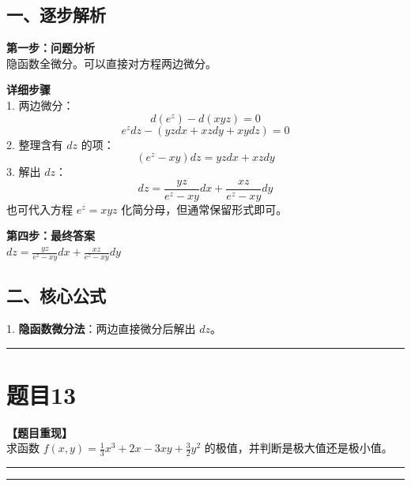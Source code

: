 \documentclass[12pt, a4paper]{ctexart}
\newcommand{\TopSeparator}{
    \par\noindent\rule{\textwidth}{1.5pt}\vspace{0.5em} %
}
\newcommand{\AnalysisSeparator}{
    \par\noindent\rule{\textwidth}{0.5pt}\vspace{0.2em}\hrule\vspace{0.5em} %
}
\newenvironment{RedAnalysis}{
    \par
    \color{red} %
}{
    \par
    \color{black} %
}
\begin{document}
\begin{RedAnalysis}

\subsection*{一、逐步解析}

\textbf{第一步：问题分析} \\
隐函数全微分。可以直接对方程两边微分。

\textbf{详细步骤} \\
1. 两边微分：
   \[ d(e^z) - d(xyz) = 0 \]
   \[ e^z dz - (yz dx + xz dy + xy dz) = 0 \]
2. 整理含有 $dz$ 的项：
   \[ (e^z - xy) dz = yz dx + xz dy \]
3. 解出 $dz$：
   \[ dz = \frac{yz}{e^z - xy} dx + \frac{xz}{e^z - xy} dy \]
   也可代入方程 $e^z = xyz$ 化简分母，但通常保留形式即可。

\textbf{第四步：最终答案} \\
$ dz = \frac{yz}{e^z - xy} dx + \frac{xz}{e^z - xy} dy $

\subsection*{二、核心公式}
1. \textbf{隐函数微分法}：两边直接微分后解出 $dz$。

\end{RedAnalysis}

\vspace{2em}

\TopSeparator
\section*{题目13}

\textbf{【题目重现】} \\
求函数 $ f(x,y)=\frac{1}{3}x^{3}+2x-3xy+\frac{3}{2}y^{2} $ 的极值，并判断是极大值还是极小值。

\AnalysisSeparator
\end{document}
